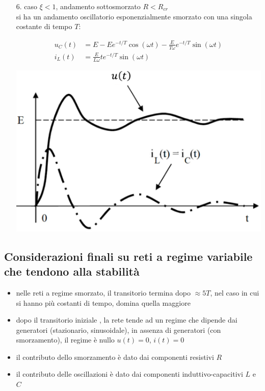 \documentclass[a4paper]{article}
\begin{document}
\begin{itemize}[itemsep=0pt]
	\item[6.] caso \(\xi < 1\), andamento sottosmorzato \(R < R_{cr}\) \\
	si ha un andamento oscillatorio esponenzialmente smorzato con una singola costante di tempo \(T\):
	
	\begin{minipage}{0.5\textwidth}
		\begin{align*}
			u_C(t) &= E - E e^{-t/T} \cos (\omega t) - \frac{E}{T\omega} e^{-t/T}\sin (\omega t) \\
			i_L(t) &= \frac{E}{L\omega}t e^{-t/T} \sin (\omega t)
		\end{align*}
	\end{minipage}
	\begin{minipage}{0.4\textwidth}
		\centering
		\includegraphics[width=0.6\linewidth]{rlc sottosmorzato.png}
	\end{minipage}
\end{itemize}

\subsection{Considerazioni finali su reti a regime variabile che tendono alla stabilità}
\begin{itemize}
	\item nelle reti a regime smorzato, il transitorio termina dopo \(\approx 5T\), nel caso in cui si hanno più
	costanti di tempo, domina quella maggiore
	\item dopo il transitorio iniziale , la rete tende ad un regime che dipende dai generatori (stazionario, sinusoidale), in
	assenza di generatori (con smorzamento), il regime è nullo \(u(t) = 0\), \(i(t) = 0\) 
	\item il contributo dello smorzamento è dato dai componenti resistivi \(R\)
	\item il contributo delle oscillazioni è dato dai componenti induttivo-capacitivi \(L\) e \(C\)
\end{itemize}
\end{document}
